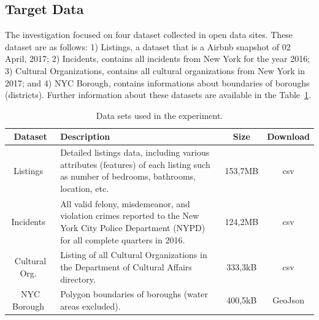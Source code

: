 \documentclass[sigconf]{acmart}
\begin{document}
\subsection{Target Data}
\label{sec:experiment_description:target_data}

The investigation focused on four dataset collected in open data sites. These dataset are as follows: 1) Listings, a dataset that is a Airbnb snapshot of 02 April, 2017; 2) Incidents, contains all incidents from New York for the year 2016; 3) Cultural Organizations, contains all cultural organizations from New York in 2017; and 4) NYC Borough, contains informations about boundaries of boroughs (districts). Further information about these datasets are available in the Table~\ref{tab:datasets}.

\begin{table}[!htpb]
	\fontsize{7pt}{7pt}\selectfont
	\centering
	\caption{Data sets used in the experiment.}
	\label{tab:datasets}
	\begin{tabular}{cp{3.5cm}cc}
		\toprule
		         \textbf{Dataset}          & \textbf{Description}                                                                                                                          & \textbf{Size} & \textbf{Download} \\ \midrule
		   Listings~\cite{base:airbnb}     & Detailed listings data, including various attributes (features) of each listing such as number of bedrooms, bathrooms, location, etc.         &    153,7MB    &        csv        \\ \midrule
		 Incidents~\cite{base:incidents}   & All valid felony, misdemeanor, and violation crimes reported to the New York City Police Department (NYPD) for all complete quarters in 2016. &    124,2MB    &        csv        \\ \midrule
		Cultural Org.~\cite{base:cultural} & Listing of all Cultural Organizations in the Department of Cultural Affairs directory.                                                        &    333,3kB    &        csv        \\ \midrule
		 NYC Borough~\cite{base:borough}   & Polygon boundaries of boroughs (water areas excluded).                                                                                        &    400,5kB    &      GeoJson      \\ \bottomrule
	\end{tabular}
\end{table}
\end{document}
